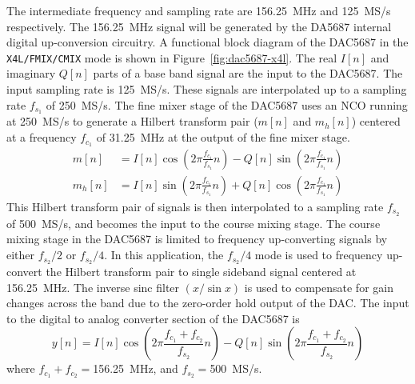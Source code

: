 \documentclass[12pt,letterpaper]{article}
\begin{document}
The intermediate frequency and sampling rate are 156.25~MHz and
125~MS/s respectively. The 156.25~MHz signal will be generated by the
DA5687 internal digital up-conversion circuitry. A functional block
diagram of the DAC5687 in the \texttt{X4L/FMIX/CMIX} mode is shown in
Figure~\ref{fig:dac5687-x4l}. The real $I[n]$ and imaginary $Q[n]$
parts of a base band signal are the input to the DAC5687. The input
sampling rate is 125~MS/s. These signals are interpolated up to a
sampling rate $f_{s_1}$ of 250~MS/s. The fine mixer stage of the
DAC5687 uses an NCO running at 250~MS/s to generate a Hilbert
transform pair ($m[n]$ and $m_h[n]$) centered at a frequency $f_{c_1}$
of 31.25~MHz at the output of the fine mixer stage.
\begin{equation}
  \begin{aligned}
    m[n] &= I[n]\cos\left(2\pi\frac{f_{c_1}}{f_{s_1}}n\right) - Q[n]\sin\left(2\pi\frac{f_{c_1}}{f_{s_1}}n\right) \\
    m_h[n] &= I[n]\sin\left(2\pi\frac{f_{c_1}}{f_{s_1}}n\right) + Q[n]\cos\left(2\pi\frac{f_{c_1}}{f_{s_1}}n\right)
  \end{aligned}
\end{equation}
This Hilbert transform pair of signals is then interpolated to a
sampling rate $f_{s_2}$ of 500~MS/s, and becomes the input to the
course mixing stage. The course mixing stage in the DAC5687 is limited
to frequency up-converting signals by either $f_{s_2}/2$ or
$f_{s_2}/4$. In this application, the $f_{s_2}/4$ mode is used to
frequency up-convert the Hilbert transform pair to single sideband
signal centered at 156.25~MHz. The inverse sinc filter $(x/\sin x)$ is
used to compensate for gain changes across the band due to the
zero-order hold output of the DAC. The input to the digital to analog
converter section of the DAC5687 is
\begin{equation}
  y[n] = I[n]\cos\left(2\pi\frac{f_{c_1}+f_{c_2}}{f_{s_2}}n\right) - Q[n]\sin\left(2\pi\frac{f_{c_1}+f_{c_2}}{f_{s_2}}n\right)
\end{equation}
where $f_{c_1}+f_{c_2}=$156.25~MHz, and $f_{s_2}=$500~MS/s.
\end{document}
